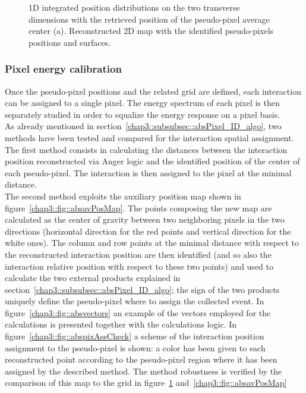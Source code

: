 \begin{figure}
\begin{subfigure}[t]{0.5\textwidth}
\caption{}
\label{chap3::fig::absfloodWithPix}
\end{subfigure}
\caption{1D integrated position distributions on the two transverse dimensions with the retrieved position of the pseudo-pixel average center (a). Reconstructed 2D map with the identified pseudo-pixels positions and surfaces.}
\label{chap3::fig::abspixID_analysis}
\end{figure}

\subsubsection{Pixel energy calibration}\label{chap3::subsubsec::absPixelEcal}

Once the pseudo-pixel positions and the related grid are defined, each interaction can be assigned to a single pixel. The energy spectrum of each pixel is then separately studied in order to equalize the energy response on a pixel basis.\\
As already mentioned in section~\ref{chap3::subsubsec::absPixel_ID_algo}, two methods have been tested and compared for the interaction spatial assignment. The first method consists in calculating the distances between the interaction position reconstructed via Anger logic and the identified position of the center of each pseudo-pixel. The interaction is then assigned to the pixel at the minimal distance.\\
The second method exploits the auxiliary position map shown in figure~\ref{chap3::fig::absavPosMap}. The points composing the new map are calculated as the center of gravity between two neighboring pixels in the two directions (horizontal direction for the red points and vertical direction for the white ones). The column and row points at the minimal distance with respect to the reconstructed interaction position are then identified (and so also the interaction relative position with respect to these two points) and used to calculate the two external products explained in section~\ref{chap3::subsubsec::absPixel_ID_algo}; the sign of the two products uniquely define the pseudo-pixel where to assign the collected event. In figure~\ref{chap3::fig::absvectors} an example of the vectors employed for the calculations is presented together with the calculations logic. In figure~\ref{chap3::fig::abspixAssCheck} a scheme of the interaction position assignment to the pseudo-pixel is shown: a color has been given to each reconstructed point according to the pseudo-pixel region where it has been assigned by the described method. The method robustness is verified by the comparison of this map to the grid in figure~\ref{chap3::fig::absfloodWithPix} and~\ref{chap3::fig::absavPosMap}   

